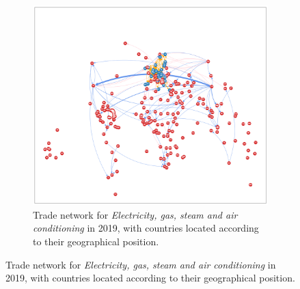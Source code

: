 \begin{figure}
    \centering
    \begin{subfigure}{0.5\textheight}
        \centering
        \includegraphics[width=\textwidth]{pics/full_y19_p35_force_79.png}
        \caption[Trade network for \textit{Electricity, gas, steam and air conditioning} in 2019]{Trade network for \textit{Electricity, gas, steam and air conditioning} in 2019, with countries located according to their geographical position.}
        \label{fig:elecgeo}
    \end{subfigure}
    

\end{figure}
